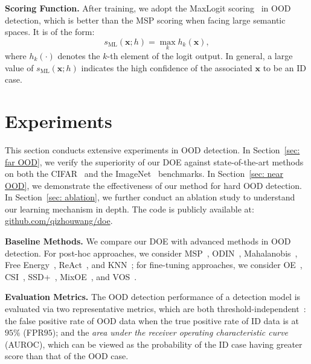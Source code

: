 \documentclass{article} \usepackage{iclr2022_conference,times}
\begin{document}
\textbf{Scoring Function.} After training, we adopt the MaxLogit scoring~\citep{HendrycksBMZKMS22} in OOD detection, which is better than the MSP scoring when facing large semantic spaces. It is of the form:
\begin{equation}
    s_\text{ML}(\boldsymbol{x};h) = \max_k h_k(\boldsymbol{x}),  \label{eq: maxlogit score}
\end{equation}
where $h_k(\cdot)$ denotes the $k$-th element of the logit output. In general, a large value of $s_\text{ML}(\boldsymbol{x};h)$ indicates the high confidence of the associated $\boldsymbol{x}$ to be an ID case. 


















\section{Experiments} \label{sec: experiment}

This section conducts extensive experiments in OOD detection. In Section~\ref{sec: far OOD}, we verify the superiority of our DOE against state-of-the-art methods on both the CIFAR~\citep{krizhevsky2009learning} and the ImageNet~\citep{deng2009imagenet} benchmarks. In Section~\ref{sec: near OOD}, we demonstrate the effectiveness of our method for hard OOD detection. In Section~\ref{sec: ablation}, we further conduct an ablation study to understand our learning mechanism in depth. The code is publicly available at: \href{https://github.com/QizhouWang/DOE}{{github.com/qizhouwang/doe}}.



\textbf{Baseline Methods.} We compare our  DOE with advanced methods in OOD detection. For post-hoc approaches, we consider MSP~\citep{hendrycks2016baseline}, ODIN~\citep{LiangLS18}, Mahalanobis~\citep{lee2018simple}, Free Energy~\citep{liu2020energy}, ReAct~\citep{sun2021react},  and KNN~\citep{SunM0L22}; for fine-tuning approaches, we consider OE~\citep{HendrycksMD19}, CSI~\citep{Tack20CSI}, SSD+~\citep{SehwagCM21}, MixOE~\citep{zhang2021mixture}, and VOS~\citep{du2022vos}.


\textbf{Evaluation Metrics.} The OOD detection performance of a detection model is evaluated via two representative metrics, which are both threshold-independent~\citep{DavisG06}: the false positive rate of OOD data when the true positive rate of ID data is at $95\%$ (FPR$95$); and the \emph{area under the receiver operating characteristic curve} (AUROC), which can be viewed as the probability of the ID case having greater score than that of the OOD case.
\end{document}
